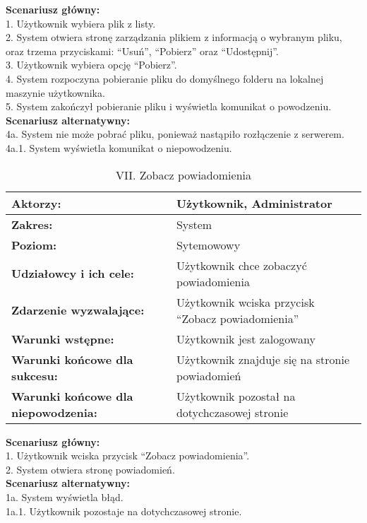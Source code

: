\textbf{Scenariusz główny:}\\
1. Użytkownik wybiera plik z listy.\\
2. System otwiera stronę zarządzania plikiem z informacją o wybranym pliku, oraz trzema przyciskami: “Usuń”, “Pobierz” oraz “Udostępnij”.\\
3. Użytkownik wybiera opcję “Pobierz”.\\
4. System rozpoczyna pobieranie pliku do domyślnego folderu na lokalnej maszynie użytkownika.\\
5. System zakończył pobieranie pliku i wyświetla komunikat o powodzeniu.\\
\textbf{Scenariusz alternatywny:}\\
4a. System nie może pobrać pliku, ponieważ nastąpiło rozłączenie z serwerem.\\
4a.1. System wyświetla komunikat o niepowodzeniu.\\

	\begin{table}[H]
\centering
\caption{VII. Zobacz powiadomienia}
\label{Zobaczpowiadomienia}
\begin{tabular}{|p{7cm}|p{7cm}|}
  \hline 
  \textbf{Aktorzy:} & Użytkownik, Administrator\\
  \hline
  \textbf{Zakres:} & System \\
	\hline
  \textbf{Poziom:} & Sytemowowy \\
	\hline
  \textbf{Udziałowcy i ich cele: } & Użytkownik chce zobaczyć powiadomienia \\
	\hline
  \textbf{Zdarzenie wyzwalające: } & Użytkownik wciska przycisk “Zobacz powiadomienia” \\
	\hline
  \textbf{Warunki wstępne: } & Użytkownik jest zalogowany 
 \\
	\hline
  \textbf{Warunki końcowe dla sukcesu:} & Użytkownik znajduje się na stronie powiadomień\\
	\hline
  \textbf{Warunki końcowe dla niepowodzenia:} & Użytkownik pozostał na dotychczasowej stronie \\
  \hline
\end{tabular} 
\end{table}
\textbf{Scenariusz główny:}\\
1. Użytkownik wciska przycisk “Zobacz powiadomienia”.\\
2. System otwiera stronę powiadomień.\\
\textbf{Scenariusz alternatywny:}\\
1a. System wyświetla błąd.\\
1a.1. Użytkownik pozostaje na dotychczasowej stronie.\\

